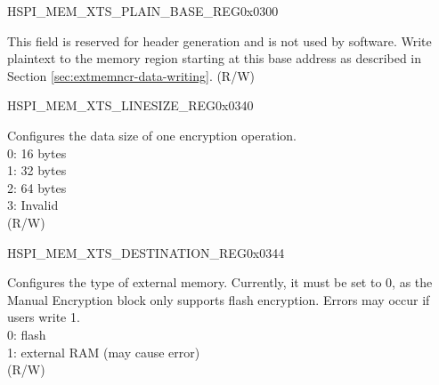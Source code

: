 
\begin{register}{H}{SPI\_MEM\_XTS\_PLAIN\_BASE\_REG}{0x0300}\label{regdesc:SPIMEMXTSPLAINBASEREG}
%
\regnewline%
\begin{regdesc}\begin{reglist}
\label{fielddesc:SPIMEMXTSPLAIN}\item [SPI\_MEM\_XTS\_PLAIN] This field is reserved for header generation and is not used by software. Write plaintext to the memory region starting at this base address as described in Section \ref{sec:extmemncr-data-writing}. (R/W)
\end{reglist}\end{regdesc}
\end{register}



\begin{register}{H}{SPI\_MEM\_XTS\_LINESIZE\_REG}{0x0340}\label{regdesc:SPIMEMXTSLINESIZEREG}
%
%
\regnewline%
\begin{regdesc}\begin{reglist}
\label{fielddesc:SPIMEMXTSLINESIZE}\item [SPI\_MEM\_XTS\_LINESIZE] Configures the data size of one encryption operation. \\
0: 16 bytes\\
1: 32 bytes\\
2: 64 bytes\\
3: Invalid\\
(R/W)
\end{reglist}\end{regdesc}
\end{register}


\begin{register}{H}{SPI\_MEM\_XTS\_DESTINATION\_REG}{0x0344}\label{regdesc:SPIMEMXTSDESTINATIONREG}
%
%
\regnewline%
\begin{regdesc}\begin{reglist}
\label{fielddesc:SPIMEMXTSDESTINATION}\item [SPI\_MEM\_XTS\_DESTINATION] Configures the type of external memory. Currently, it must be set to 0, as the Manual Encryption block only supports flash encryption. Errors may occur if users write 1.\\
0: flash\\
1: external RAM (may cause error)\\
(R/W)
\end{reglist}\end{regdesc}
\end{register}


